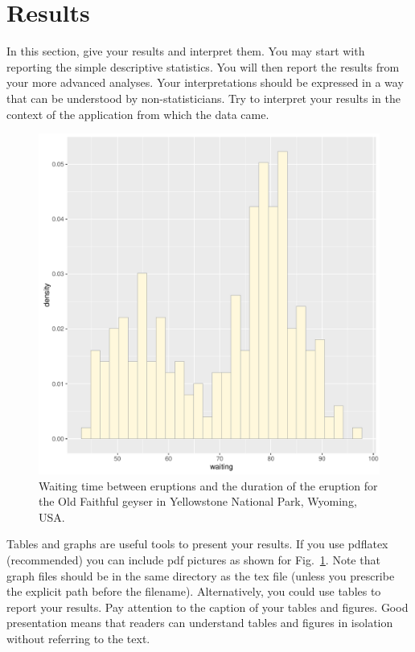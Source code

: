 \documentclass[a4paper,amsmath, 12pt]{article}
\begin{document}




\section{Results}
In this section, give your results and interpret them. You may start with reporting the simple descriptive statistics. You will then report the results from your more advanced analyses.  Your interpretations should be expressed in a way that can be understood by non-statisticians. Try to interpret your results in the context of the application from which the data came.


\begin{figure}[h]
\begin{center}
\includegraphics[scale=0.5]{figures/histogram.pdf}
\caption{\label{fig:hist} Waiting time between eruptions and the duration of the eruption for the Old Faithful geyser in Yellowstone National Park, Wyoming, USA.}
\end{center}
\end{figure}

Tables and graphs are useful tools to present your results. If you use pdflatex (recommended) you can include pdf pictures as shown for Fig.~\ref{fig:hist}.
Note that graph files should be in the same directory as the tex file (unless you prescribe the explicit path before the filename). Alternatively, you could use tables to report your results. Pay attention to the caption of your tables and figures. Good presentation means that readers can understand tables and figures in isolation without referring to the text.
\end{document}
